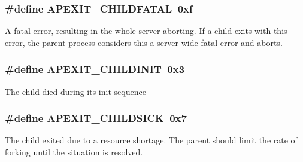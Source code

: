 \subsubsection[{\texorpdfstring{A\+P\+E\+X\+I\+T\+\_\+\+C\+H\+I\+L\+D\+F\+A\+T\+AL}{APEXIT_CHILDFATAL}}]{\setlength{\rightskip}{0pt plus 5cm}\#define A\+P\+E\+X\+I\+T\+\_\+\+C\+H\+I\+L\+D\+F\+A\+T\+AL~0xf}\hypertarget{group__APACHE__CORE__DAEMON_gaded5da364cad9d77f9c3dae73bd1d4bf}{}\label{group__APACHE__CORE__DAEMON_gaded5da364cad9d77f9c3dae73bd1d4bf}
A fatal error, resulting in the whole server aborting. If a child exits with this error, the parent process considers this a server-\/wide fatal error and aborts. 
\subsubsection[{\texorpdfstring{A\+P\+E\+X\+I\+T\+\_\+\+C\+H\+I\+L\+D\+I\+N\+IT}{APEXIT_CHILDINIT}}]{\setlength{\rightskip}{0pt plus 5cm}\#define A\+P\+E\+X\+I\+T\+\_\+\+C\+H\+I\+L\+D\+I\+N\+IT~0x3}\hypertarget{group__APACHE__CORE__DAEMON_gac7e17446142d98480983c42cad11b216}{}\label{group__APACHE__CORE__DAEMON_gac7e17446142d98480983c42cad11b216}
The child died during its init sequence 
\subsubsection[{\texorpdfstring{A\+P\+E\+X\+I\+T\+\_\+\+C\+H\+I\+L\+D\+S\+I\+CK}{APEXIT_CHILDSICK}}]{\setlength{\rightskip}{0pt plus 5cm}\#define A\+P\+E\+X\+I\+T\+\_\+\+C\+H\+I\+L\+D\+S\+I\+CK~0x7}\hypertarget{group__APACHE__CORE__DAEMON_gaa1491b2252978d25f8bc8c5897f5f1b7}{}\label{group__APACHE__CORE__DAEMON_gaa1491b2252978d25f8bc8c5897f5f1b7}
The child exited due to a resource shortage. The parent should limit the rate of forking until the situation is resolved. 
